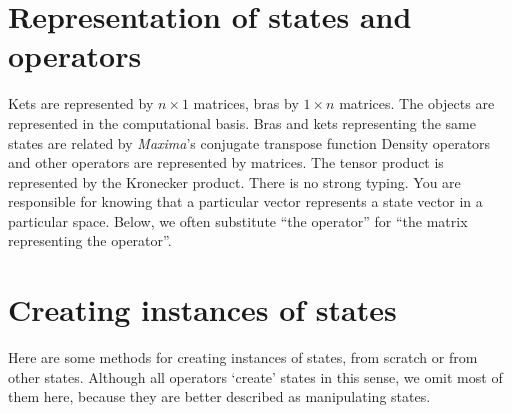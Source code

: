 \documentclass[leqno,10pt]{article}
\makeatletter
\newcommand{\fs}[1]{{\bf #1}}
\newcommand{\ibd}[1]{\index{#1@{\bf #1}}} %
\newcommand{\pname}[1]{{\it #1}} %
\newcommand{\maxcom}{\textsuperscript{$\dagger$}}
\makeatother
\begin{document}
\section{Representation of states and operators}
Kets are represented by $n \times 1$ matrices, bras by $1
\times n$ matrices. The objects
are represented in the computational basis.  Bras and kets
representing the same states are related by \pname{Maxima}'s conjugate
transpose 
 function 
Density operators and other operators
are represented by matrices.  The tensor product 
is represented by the Kronecker product.  There is no strong
typing. You are responsible for knowing that a particular
vector represents a state vector in a particular space.
Below, we often substitute ``the operator'' for
``the matrix representing the operator''.

\htmlrule
\section{Creating instances of states}
Here are some methods for creating instances of states, from scratch or
from other states. Although all operators  `create' states in this
sense, we omit most of them here, because they are better described as manipulating
states.
\end{document}
